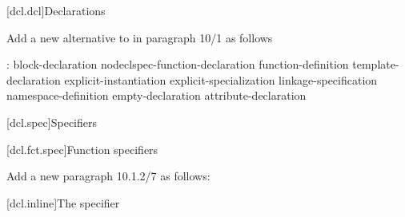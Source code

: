 \setcounter{chapter}{9}
[dcl.dcl]{Declarations}%


\noindent
Add a new alternative to  in paragraph 10/1 as follows
\begin{std.txt}
  \begin{bnf}
    :\br
      block-declaration\br
      nodeclspec-function-declaration\br
      function-definition\br
      template-declaration\br
      explicit-instantiation\br
      explicit-specialization\br
      linkage-specification\br
      namespace-definition\br
      empty-declaration\br
      attribute-declaration\br
      \color{addclr}
  \end{bnf}
  \end{std.txt}


\setcounter{section}{0}
[dcl.spec]{Specifiers}%

\setcounter{subsection}{1}
[dcl.fct.spec]{Function specifiers}%

\noindent
Add a new paragraph 10.1.2/7 as follows:
\begin{std.txt}
  \color{addclr}
  \resetalinea[6]
  \alinea
\end{std.txt}


\setcounter{subsection}{5}
[dcl.inline]{The  specifier}%

